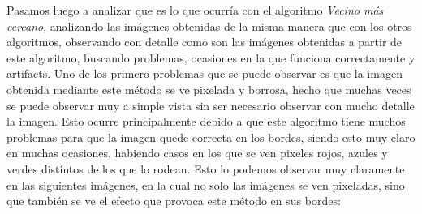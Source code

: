 \documentclass[10pt, a4paper]{article}
\begin{document}
Pasamos luego a analizar que es lo que ocurr\'ia con el algoritmo \textit{Vecino m\'as cercano}, analizando las im\'agenes obtenidas de la misma manera que con los otros algoritmos, observando con detalle como son las im\'agenes obtenidas a partir de este algoritmo, buscando problemas, ocasiones en la que funciona correctamente y artifacts.
Uno de los primero problemas que se puede observar es que la imagen obtenida mediante este m\'etodo se ve pixelada y borrosa, hecho que muchas veces se puede observar muy a simple vista sin ser necesario observar con mucho detalle la imagen. Esto ocurre principalmente debido a que este algoritmo tiene muchos problemas para que la imagen quede correcta en los bordes, siendo esto muy claro en muchas ocasiones, habiendo casos en los que se ven pixeles rojos, azules y verdes distintos de los que lo rodean. Esto lo podemos observar muy claramente en las siguientes im\'agenes, en la cual no solo las im\'agenes se ven pixeladas, sino que tambi\'en se ve el efecto que provoca este m\'etodo en sus bordes:
\end{document}
